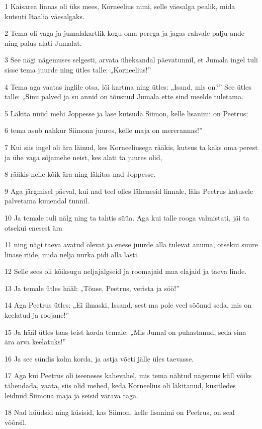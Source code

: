 \par 1 Kaisarea linnas oli üks mees, Korneelius nimi, selle väesalga pealik, mida kutsuti Itaalia väesalgaks.
\par 2 Tema oli vaga ja jumalakartlik kogu oma perega ja jagas rahvale palju ande ning palus alati Jumalat.
\par 3 See nägi nägemuses selgesti, arvata üheksandal päevatunnil, et Jumala ingel tuli sisse tema juurde ning ütles talle: „Korneelius!”
\par 4 Tema aga vaatas inglile otsa, lõi kartma ning ütles: „Isand, mis on?” See ütles talle: „Sinu palved ja su annid on tõusnud Jumala ette sind meelde tuletama.
\par 5 Läkita nüüd mehi Joppesse ja lase kutsuda Siimon, kelle lisanimi on Peetrus;
\par 6 tema asub nahkur Siimona juures, kelle maja on mererannas!”
\par 7 Kui siis ingel oli ära läinud, kes Korneeliusega rääkis, kutsus ta kaks oma perest ja ühe vaga sõjamehe neist, kes alati ta juures olid,
\par 8 rääkis neile kõik ära ning läkitas nad Joppesse.
\par 9 Aga järgmisel päeval, kui nad teel olles lähenesid linnale, läks Peetrus katusele palvetama kuuendal tunnil.
\par 10 Ja temale tuli nälg ning ta tahtis süüa. Aga kui talle rooga valmistati, jäi ta otsekui enesest ära
\par 11 ning nägi taeva avatud olevat ja enese juurde alla tulevat anuma, otsekui suure linase riide, mida nelja nurka pidi alla lasti.
\par 12 Selle sees oli kõiksugu neljajalgseid ja roomajaid maa elajaid ja taeva linde.
\par 13 Ja temale ütles hääl: „Tõuse, Peetrus, verista ja söö!”
\par 14 Aga Peetrus ütles: „Ei ilmaski, Issand, sest ma pole veel söönud seda, mis on keelatud ja roojane!”
\par 15 Ja hääl ütles taas teist korda temale: „Mis Jumal on puhastanud, seda sina ära arva keelatuks!”
\par 16 Ja see sündis kolm korda, ja astja võeti jälle üles taevasse.
\par 17 Aga kui Peetrus oli iseeneses kahevahel, mis tema nähtud nägemus küll võiks tähendada, vaata, siis olid mehed, keda Korneelius oli läkitanud, küsitledes leidnud Siimona maja ja seisid värava taga.
\par 18 Nad hüüdsid ning küsisid, kas Siimon, kelle lisanimi on Peetrus, on seal võõrsil.
